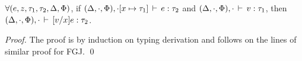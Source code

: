 \begin{lemma}
\label{lem:substitution}
$\forall(e,z,\tau_1,\tau_2,\Delta,\Phi)$, if $(\Delta,\cdot,
\Phi),\cdot[x\mapsto\tau_1]\,\vdash\,e:\tau_2$ and $(\Delta,\cdot,
\Phi),\cdot\,\vdash\,v:\tau_1$, then $(\Delta,\cdot,
\Phi),\cdot\,\vdash\,[v/x]e:\tau_2$.
\end{lemma}
\begin{proof}
The proof is by induction on typing derivation and follows on the
lines of similar proof for FGJ.
\qed
\end{proof}





